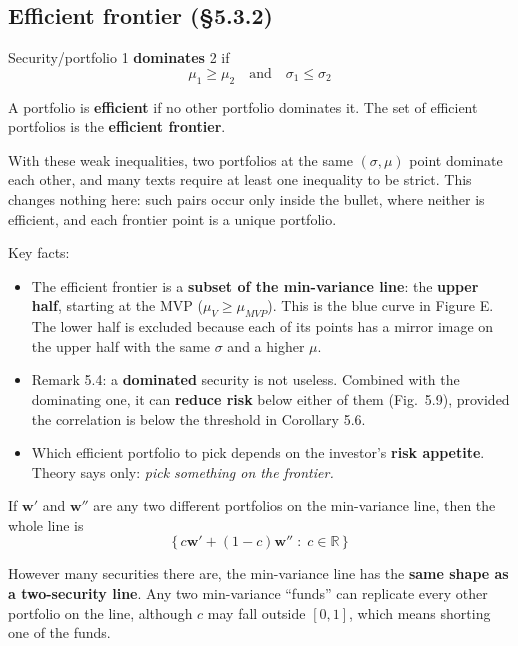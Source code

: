 \documentclass[titlepage,11pt,a4paper]{article}
\newcommand{\vw}{\boldsymbol{w}}
\begin{document}
\subsection{Efficient frontier (\S5.3.2)}

\begin{result}
Security/portfolio 1 \textbf{dominates} 2 if
\[\mu_1\ge\mu_2\quad\text{and}\quad\sigma_1\le\sigma_2\]
\end{result}

\begin{result}
A portfolio is \textbf{efficient} if no other portfolio dominates it. The set of efficient portfolios is the \textbf{efficient frontier}.
\end{result}

With these weak inequalities, two portfolios at the same $(\sigma,\mu)$ point dominate each other, and many texts require at least one inequality to be strict. This changes nothing here: such pairs occur only inside the bullet, where neither is efficient, and each frontier point is a unique portfolio.

Key facts:
\begin{itemize}
  \item The efficient frontier is a \textbf{subset of the min-variance line}: the \textbf{upper half}, starting at the MVP ($\mu_V\ge\mu_{MVP}$). This is the blue curve in Figure E. The lower half is excluded because each of its points has a mirror image on the upper half with the same $\sigma$ and a higher $\mu$.
  \item Remark 5.4: a \textbf{dominated} security is not useless. Combined with the dominating one, it can \textbf{reduce risk} below either of them (Fig.\ 5.9), provided the correlation is below the threshold in Corollary 5.6.
  \item Which efficient portfolio to pick depends on the investor's \textbf{risk appetite}. Theory says only: \emph{pick something on the frontier.}
\end{itemize}

\begin{result}
If $\vw'$ and $\vw''$ are any two different portfolios on the min-variance line, then the whole line is
\[\{\,c\vw'+(1-c)\vw''\;:\;c\in\mathbb R\,\}\]
\end{result}

\begin{practice}
However many securities there are, the min-variance line has the \textbf{same shape as a two-security line}. Any two min-variance ``funds'' can replicate every other portfolio on the line, although $c$ may fall outside $[0,1]$, which means shorting one of the funds.
\end{practice}
\end{document}
